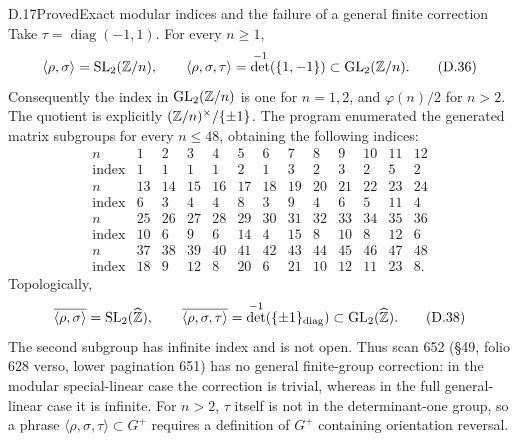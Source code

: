 \begin{statement}{D.17}{Proved}{Exact modular indices and the failure of a general finite correction}
Take
\(\tau=\operatorname{diag}(-1,1)\).
For every \(n\ge1\),
\[
 \langle\rho,\sigma\rangle=\operatorname{SL}_2(\mathbb Z/n),\qquad
 \langle\rho,\sigma,\tau\rangle
     =\det^{-1}(\{1,-1\})\subset\operatorname{GL}_2(\mathbb Z/n).
 \tag{D.36}
\]
Consequently the index in \(\operatorname{GL}_2(\mathbb Z/n)\) is one for
\(n=1,2\), and \(\varphi(n)/2\) for \(n>2\).
The quotient is explicitly
\((\mathbb Z/n)^\times/\{\pm1\}\).
The program enumerated the generated matrix subgroups for
every \(n\le48\), obtaining the following indices:
\[
\begin{array}{r|rrrrrrrrrrrr}
n&1&2&3&4&5&6&7&8&9&10&11&12\\ \hline
\mathrm{index}&1&1&1&1&2&1&3&2&3&2&5&2\\[2pt]
n&13&14&15&16&17&18&19&20&21&22&23&24\\ \hline
\mathrm{index}&6&3&4&4&8&3&9&4&6&5&11&4\\[2pt]
n&25&26&27&28&29&30&31&32&33&34&35&36\\ \hline
\mathrm{index}&10&6&9&6&14&4&15&8&10&8&12&6\\[2pt]
n&37&38&39&40&41&42&43&44&45&46&47&48\\ \hline
\mathrm{index}&18&9&12&8&20&6&21&10&12&11&23&8 .
\end{array}                                                   \tag{D.37}
\]
Topologically,
\[
 \overline{\langle\rho,\sigma\rangle}
    =\operatorname{SL}_2(\widehat{\mathbb Z}),\qquad
 \overline{\langle\rho,\sigma,\tau\rangle}
    =\det^{-1}(\{\pm1\}_{\mathrm{diag}})
       \subset\operatorname{GL}_2(\widehat{\mathbb Z}).
 \tag{D.38}
\]
The second subgroup has infinite index and is not open.
Thus scan 652 (\S49, folio 628 verso, lower pagination 651)
has no general
finite-group correction: in the modular special-linear
case the correction is trivial, whereas in the full
general-linear case it is infinite.
For \(n>2\), \(\tau\) itself is not in the determinant-one
group, so a phrase \(\langle\rho,\sigma,\tau\rangle
\subset G^+\) requires a definition of \(G^+\) containing
orientation reversal.
\end{statement}
